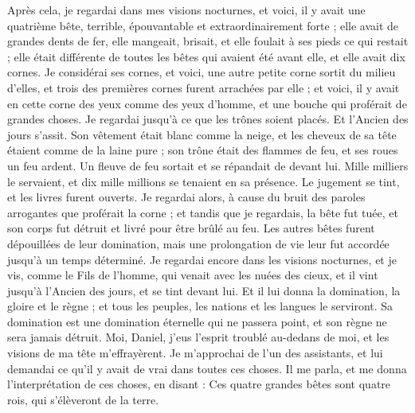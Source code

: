 \begin{multicols}{2}
Après cela, je regardai dans mes visions nocturnes, et voici, il y avait une quatrième bête, terrible, épouvantable et extraordinairement forte ; elle avait de grandes dents de fer, elle mangeait, brisait, et elle foulait à ses pieds ce qui restait ; elle était différente de toutes les bêtes qui avaient été avant elle, et elle avait dix cornes.
Je considérai ses cornes, et voici, une autre petite corne sortit du milieu d'elles, et trois des premières cornes furent arrachées par elle ; et voici, il y avait en cette corne des yeux comme des yeux d'homme, et une bouche qui proférait de grandes choses.
Je regardai jusqu'à ce que les trônes soient placés. Et l'Ancien des jours s'assit. Son vêtement était blanc comme la neige, et les cheveux de sa tête étaient comme de la laine pure ; son trône était des flammes de feu, et ses roues un feu ardent.
Un fleuve de feu sortait et se répandait de devant lui. Mille milliers le servaient, et dix mille millions se tenaient en sa présence. Le jugement se tint, et les livres furent ouverts.
Je regardai alors, à cause du bruit des paroles arrogantes que proférait la corne ; et tandis que je regardais, la bête fut tuée, et son corps fut détruit et livré pour être brûlé au feu.
Les autres bêtes furent dépouillées de leur domination, mais une prolongation de vie leur fut accordée jusqu'à un temps déterminé.
Je regardai encore dans les visions nocturnes, et je vis, comme le Fils de l'homme, qui venait avec les nuées des cieux, et il vint jusqu'à l'Ancien des jours, et se tint devant lui.
Et il lui donna la domination, la gloire et le règne ; et tous les peuples, les nations et les langues le serviront. Sa domination est une domination éternelle qui ne passera point, et son règne ne sera jamais détruit.
Moi, Daniel, j'eus l'esprit troublé au-dedans de moi, et les visions de ma tête m'effrayèrent.
Je m'approchai de l'un des assistants, et lui demandai ce qu'il y avait de vrai dans toutes ces choses. Il me parla, et me donna l'interprétation de ces choses, en disant :
Ces quatre grandes bêtes sont quatre rois, qui s'élèveront de la terre.

\end{multicols}
